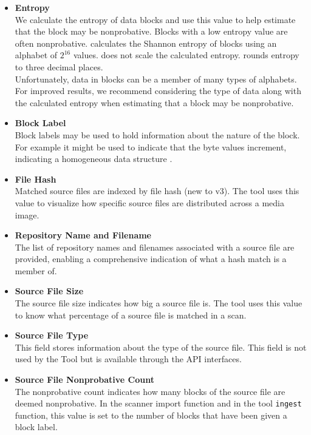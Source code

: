 \documentclass[11pt,fleqn]{article} %
\begin{document}
\begin{itemize}
\item \textbf{Entropy}\\
We calculate the entropy of data blocks and use this value to help estimate that the block may be nonprobative. Blocks with a low entropy value are often nonprobative. \hdb calculates the Shannon entropy of blocks using an alphabet of $2^{16}$ values. \hdb does not scale the calculated entropy. \hdb rounds entropy to three decimal places.\\

Unfortunately, data in blocks can be a member of many types of alphabets. For improved results, we recommend considering the type of data along with the calculated entropy when estimating that a block may be nonprobative.
\item \textbf{Block Label}\\
Block labels may be used to hold information about the nature of the block.  For example it might be used to indicate that the byte values increment, indicating a homogeneous data structure \cite{hashBasedCarving}.
\item \textbf{File Hash}\\
Matched source files are indexed by file hash (new to \hdb v3). The \sscope tool uses this value to visualize how specific source files are distributed across a media image.
\item \textbf{Repository Name and Filename}\\
The list of repository names and filenames associated with a source file are provided, enabling a comprehensive indication of what a hash match is a member of.
\item \textbf{Source File Size}\\
The source file size indicates how big a source file is. The \sscope tool uses this value to know what percentage of a source file is matched in a scan.
\item \textbf{Source File Type}\\
This field stores information about the type of the source file. This field is not used by the \hdb Tool but is available through the \hdb API interfaces.
\item \textbf{Source File Nonprobative Count}\\
The nonprobative count indicates how many blocks of the source file are deemed nonprobative. In the \bulk \hdb scanner import function and in the \hdb tool \verb+ingest+ function, this value is set to the number of blocks that have been given a block label.
\end{itemize}
\end{document}
